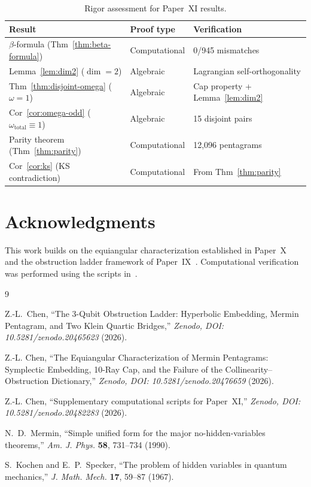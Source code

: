 \documentclass[11pt,a4paper]{article}
\theoremstyle{remark}
\begin{document}
\begin{table}[H]
\centering
\begin{tabular}{@{}l l l@{}}
\toprule
Result & Proof type & Verification \\
\midrule
$\beta$-formula (Thm~\ref{thm:beta-formula}) & Computational & 0/945 mismatches \\
Lemma~\ref{lem:dim2} ($\dim = 2$) & Algebraic & Lagrangian self-orthogonality \\
Thm~\ref{thm:disjoint-omega} ($\omega = 1$) & Algebraic & Cap property + Lemma~\ref{lem:dim2} \\
Cor~\ref{cor:omega-odd} ($\omega_{\text{total}} \equiv 1$) & Algebraic & 15 disjoint pairs \\
Parity theorem (Thm~\ref{thm:parity}) & Computational & 12{,}096 pentagrams \\
Cor~\ref{cor:ks} (KS contradiction) & Computational & From Thm~\ref{thm:parity} \\
\bottomrule
\end{tabular}
\caption{Rigor assessment for Paper~XI results.}
\label{tab:rigor}
\end{table}

\section*{Acknowledgments}

This work builds on the equiangular characterization established in
Paper~X~\cite{PaperX} and the obstruction ladder framework of
Paper~IX~\cite{PaperIX}. Computational verification was performed using
the scripts in~\cite{PaperXIsuppl}.

\begin{thebibliography}{9}


Z.-L.~Chen,
``The 3-Qubit Obstruction Ladder: Hyperbolic Embedding,
Mermin Pentagram, and Two Klein Quartic Bridges,''
\textit{Zenodo, DOI: 10.5281/zenodo.20465623} (2026).

Z.-L. Chen,
``The Equiangular Characterization of Mermin Pentagrams:
Symplectic Embedding, 10-Ray Cap, and the Failure of the
Collinearity--Obstruction Dictionary,''
\textit{Zenodo, DOI: 10.5281/zenodo.20476659} (2026).

Z.-L. Chen,
``Supplementary computational scripts for Paper~XI,''
\textit{Zenodo, DOI: 10.5281/zenodo.20482283} (2026).

N.~D.~Mermin,
``Simple unified form for the major no-hidden-variables theorems,''
\textit{Am. J. Phys.} \textbf{58}, 731--734 (1990).

S.~Kochen and E.~P.~Specker,
``The problem of hidden variables in quantum mechanics,''
\textit{J. Math. Mech.} \textbf{17}, 59--87 (1967).

\end{thebibliography}
\end{document}
